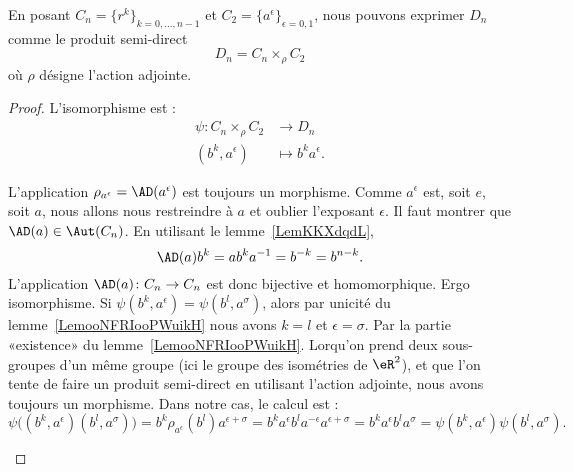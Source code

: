 \begin{proposition}
	En posant \( C_n=\{ r^k \}_{k=0,\ldots, n-1}\) et \( C_2=\{ a^{\epsilon} \}_{\epsilon=0,1}\), nous pouvons exprimer \( D_n\) comme le produit semi-direct
	\begin{equation}
		D_n=C_n\times_{\rho}C_2
	\end{equation}
	où \( \rho\) désigne l'action adjointe.
\end{proposition}

\begin{proof}
	L'isomorphisme est :
	\begin{equation}
		\begin{aligned}
			\psi\colon C_n\times_{\rho}C_2 & \to D_n                  \\
			(b^k,a^{\epsilon})             & \mapsto b^ka^{\epsilon}.
		\end{aligned}
	\end{equation}
	\begin{subproof}
		L'application \( \rho_{a^{\epsilon}}=\AD(a^{\epsilon})\) est toujours un morphisme. Comme \( a^{\epsilon}\) est, soit \( e\), soit \( a\), nous allons nous restreindre à \( a\) et oublier l'exposant \( \epsilon\). Il faut montrer que \( \AD(a)\in\Aut(C_n)\). En utilisant le lemme~\ref{LemKKXdqdL},
		\begin{equation}
			\AD(a)b^k=ab^ka^{-1}=b^{-k}=b^{n-k}.
		\end{equation}
		L'application \( \AD(a)\colon C_n\to C_n\) est donc bijective et homomorphique. Ergo isomorphisme.
		\spitem[Injectif]
		Si \( \psi(b^k,a^{\epsilon})=\psi(b^l,a^{\sigma})\), alors par unicité du lemme~\ref{LemooNFRIooPWuikH} nous avons \( k=l\) et \( \epsilon=\sigma\).
		\spitem[Surjectif]
		Par la partie «existence»  du lemme~\ref{LemooNFRIooPWuikH}.
		\spitem[Morphisme]
		Lorqu'on prend deux sous-groupes d'un même groupe (ici le groupe des isométries de \( \eR^2\)), et que l'on tente de faire un produit semi-direct en utilisant l'action adjointe, nous avons toujours un morphisme. Dans notre cas, le calcul est :
		\begin{equation}
			\psi\big( (b^k,a^{\epsilon})(b^l,a^{\sigma}) \big)=b^k\rho_{a^{\epsilon}}(b^l)a^{\epsilon+\sigma}=b^ka^{\epsilon}b^la^{-\epsilon}a^{\epsilon+\sigma}=b^ka^{\epsilon}b^la^{\sigma}=\psi(b^k,a^{\epsilon})\psi(b^l,a^{\sigma}).
		\end{equation}
	\end{subproof}
\end{proof}

